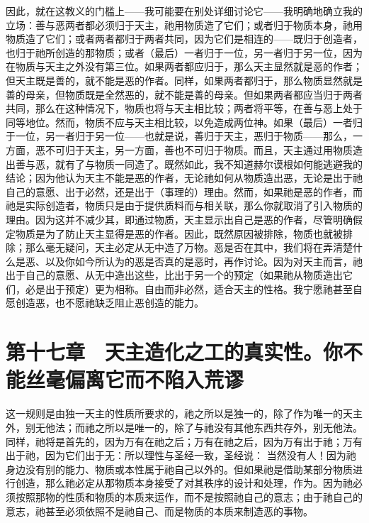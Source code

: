 因此，就在这教义的门槛上——我可能要在别处详细讨论它——我明确地确立我的立场：善与恶两者都必须归于天主，祂用物质造了它们；或者归于物质本身，祂用物质造了它们；或者两者都归于两者共同，因为它们是相连的——既归于创造者，也归于祂所创造的那物质；或者（最后）一者归于一位，另一者归于另一位，因为在物质与天主之外没有第三位。如果两者都应归于，那么天主显然就是恶的作者；但天主既是善的，就不能是恶的作者。同样，如果两者都归于，那么物质显然就是善的母亲，但物质既是全然恶的，就不能是善的母亲。但如果两者都应当归于两者共同，那么在这种情况下，物质也将与天主相比较；两者将平等，在善与恶上处于同等地位。然而，物质不应与天主相比较，以免造成两位神。如果（最后）一者归于一位，另一者归于另一位——也就是说，善归于天主，恶归于物质——那么，一方面，恶不可归于天主，另一方面，善也不可归于物质。而且，天主通过用物质造出善与恶，就有了与物质一同造了。既然如此，我不知道赫尔谟根如何能逃避我的结论；因为他认为天主不能是恶的作者，无论祂如何从物质造出恶，无论是出于祂自己的意愿、出于必然，还是出于（事理的）理由。然而，如果祂是恶的作者，而祂是实际创造者，物质只是由于提供质料而与相关联，那么你就取消了引入物质的理由。因为这并不减少其，即通过物质，天主显示出自己是恶的作者，尽管明确假定物质是为了防止天主显得是恶的作者。因此，既然原因被排除，物质也就被排除；那么毫无疑问，天主必定从无中造了万物。恶是否在其中，我们将在弄清楚什么是恶、以及你如今所认为的恶是否真的是恶时，再作讨论。因为对天主而言，祂出于自己的意愿、从无中造出这些，比出于另一个的预定（如果祂从物质造出它们，必是出于预定）更为相称。自由而非必然，适合天主的性格。我宁愿祂甚至自愿创造恶，也不愿祂缺乏阻止恶创造的能力。\par


\section{第十七章　天主造化之工的真实性。你不能丝毫偏离它而不陷入荒谬}

这一规则是由独一天主的性质所要求的，祂之所以是独一的，除了作为唯一的天主外，别无他法；而祂之所以是唯一的，除了与祂没有其他东西共存外，别无他法。同样，祂将是首先的，因为万有在祂之后；万有在祂之后，因为万有出于祂；万有出于祂，因为它们出于无：所以理性与圣经一致，圣经说： 当然没有人！因为祂身边没有别的能力、物质或本性属于祂自己以外的。但如果祂是借助某部分物质进行创造，那么祂必定从那物质本身接受了对其秩序的设计和处理，作为。因为祂必须按照那物的性质和物质的本质来运作，而不是按照祂自己的意志；由于祂自己的意志，祂甚至必须依照不是祂自己、而是物质的本质来制造恶的事物。\par

